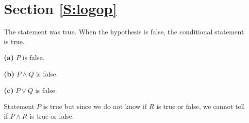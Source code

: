 \section*{Section \ref{S:logop}}

\begin{list}{\bf{\ref{exer:sec22-1}.}} 
\item The statement was true. When the hypothesis is false, the conditional statement is true.
\end{list}

\begin{list}{\bf{\ref{exer:sec22-2}.}} 
\item \begin{multicols}{3}
\textbf{(a)} $P$ is false.  

\textbf{(b)} $P \wedge Q$ is false.

\textbf{(c)} $P \vee Q$ is false.
\end{multicols}
\end{list}



\begin{list}{\bf{\ref{exer:statements4}.}}
%
%
%
\item \begin{list}{\bf{(c)}}
\item Statement $P$ is true but since we do not know if $R$ is true or false, we cannot tell if $P \wedge R$ is true or false.
\end{list}
\end{list}

